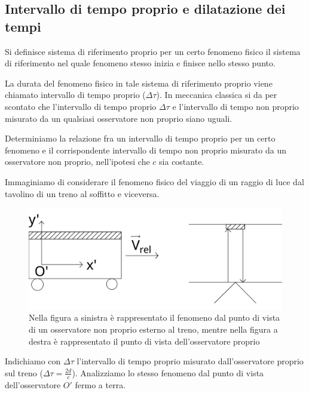     \subsection{Intervallo di tempo proprio e dilatazione dei tempi}
        \par Si definisce sistema di riferimento proprio per un certo fenomeno fisico il sistema di riferimento nel quale fenomeno stesso inizia e finisce nello stesso punto.
        \par La durata del fenomeno fisico in tale sistema di riferimento proprio viene chiamato intervallo di tempo proprio ($\Delta\tau$). In meccanica classica si da per scontato che l'intervallo di tempo proprio $\Delta\tau$ e l'intervallo di tempo non proprio misurato da un qualsiasi osservatore non proprio siano uguali.
        \par Determiniamo la relazione fra un intervallo di tempo proprio per un certo fenomeno e il corrispondente intervallo di tempo non proprio misurato da un osservatore non proprio, nell'ipotesi che $c$ sia costante.
        \par Immaginiamo di considerare il fenomeno fisico del viaggio di un raggio di luce dal tavolino di un treno al soffitto e viceversa.
        \begin{figure}[h]
            \caption{Nella figura a sinistra è rappresentato il fenomeno dal punto di vista di un osservatore non proprio esterno al treno, mentre nella figura a destra è rappresentato il punto di vista dell'osservatore proprio}
            \centering
            \includegraphics[width=15cm]{res/53reltempo}
        \end{figure}
        \par Indichiamo con $\Delta\tau$ l'intervallo di tempo proprio misurato dall'osservatore proprio sul treno ($\Delta\tau=\frac{2d}{c}$). Analizziamo lo stesso fenomeno dal punto di vista dell'osservatore $O'$ fermo a terra.
